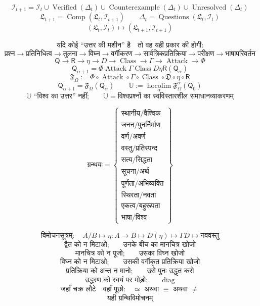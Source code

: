 \documentclass{article}
\begin{document}
\[\boxed{\mathcal I_{t+1}=\mathcal I_t\cup\operatorname{Verified}(\Delta_t)
\cup\operatorname{Counterexample}(\Delta_t)\cup
\operatorname{Unresolved}(\Delta_t)}\]
\[\boxed{\mathfrak L_{t+1}=\operatorname{Comp}(\mathfrak L_t,\mathcal I_{t+1})}
\qquad\boxed{\Delta_t=\operatorname{Questions}\left(\mathfrak L_t,\mathcal I_t\right)}\]
\[\boxed{(\mathfrak L_t,\mathcal I_t)\longmapsto
(\mathfrak L_{t+1},\mathcal I_{t+1})}\]

\[\boxed{\text{यदि कोई ``उत्तर की मशीन'' है}\quad
\text{तो वह यही प्रकार की होगी:}}\]
\[\boxed{\text{प्रश्न}\to\text{प्रतिनिधित्व}\to\text{तुलना}\to\text{विघ्न}
\to\text{वर्गीकरण}\to\text{सार्वत्रिकप्रतिक्रिया}\to\text{परीक्षण}
\to\text{भाषापरिवर्तन}}\]
\[\boxed{\mathsf Q\to\mathsf R\to\eta\to D\to\operatorname{Class}\to\Gamma
\to\operatorname{Attack}\to\Phi}\]
\[\boxed{\mathsf Q_{\alpha+1}=\Phi\operatorname{Attack}\Gamma
\operatorname{Class}D\eta\mathsf R(\mathsf Q_\alpha)}\]
\[\boxed{\mathfrak F_{\Omega}:=\Phi\circ\operatorname{Attack}\circ\Gamma
\circ\operatorname{Class}\circ\mathfrak D\circ\eta\circ\mathsf R}\]
\[\boxed{\mathsf Q_{\alpha+1}=\mathfrak F_{\Omega}(\mathsf Q_\alpha)}\qquad
\boxed{\mathbb U:=\operatorname*{hocolim}_{\alpha}
\mathfrak F_{\Omega}^{\alpha}(\mathsf Q_0)}\]
\[\boxed{\mathbb U\text{ ``विश्व का उत्तर'' नहीं;}\qquad
\mathbb U=\text{विश्वप्रश्नों का स्वविस्तारशील समाधानव्याकरणम्}}\]

\[\boxed{\text{ग्रन्थयः}=\left\{\begin{array}{c}
\text{स्थानीय/वैश्विक}\\ \text{जनन/पुनर्निर्माण}\\ \text{वर्ण/अवर्ण}\\
\text{वस्तु/प्रतिस्पन्द}\\ \text{सत्य/सिद्धता}\\ \text{सूचना/अर्थ}\\
\text{पूर्णता/अभिव्यक्ति}\\ \text{स्थिरता/नवता}\\ \text{एकत्व/बहुरूपता}\\
\text{भाषा/विश्व}\end{array}\right\}}\]

\[\boxed{\text{विमोचनसूत्रम्}:\quad A/B\mapsto\eta:A\to B\mapsto D(\eta)
\mapsto\Gamma D\mapsto\text{नववस्तु}}\]
\[\boxed{\text{द्वैत को न मिटाओ;}\qquad\text{उनके बीच का मानचित्र खोजो}}\]
\[\boxed{\text{मानचित्र को न पूजो;}\qquad\text{उसका विघ्न खोजो}}\]
\[\boxed{\text{विघ्न को न मिटाओ;}\qquad\text{उसकी वर्गीकृत प्रतिक्रिया खोजो}}\]
\[\boxed{\text{प्रतिक्रिया को अन्त न मानो;}\qquad\text{उसे पुनः उद्धृत करो}}\]
\[\boxed{\text{उद्धरण को स्वयं पर मोड़ो;}\qquad\operatorname{diag}}\]
\[\boxed{\text{जहाँ चक्र लौटे}\quad\text{वहाँ पूछो:}\quad\simeq
\text{ अथवा }\equiv\text{ अथवा }\neq}\]
\[\boxed{\text{यही ग्रन्थिविमोचनम्}}\]
\end{document}
